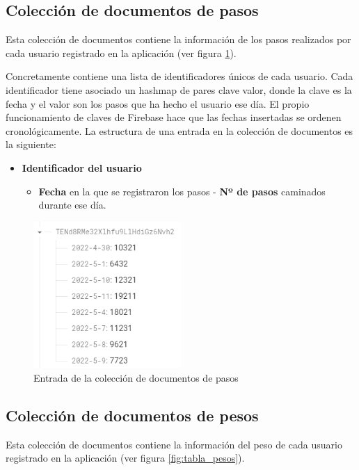 
\subsection{Colección de documentos de pasos}
Esta colección de documentos contiene la información de los pasos realizados por cada usuario registrado en la aplicación (ver figura \ref{fig:tabla_pasos}).

Concretamente contiene una lista de identificadores únicos de cada usuario. Cada identificador tiene asociado un hashmap  de pares clave valor, donde la clave es la fecha y el valor son los pasos que ha hecho el usuario ese día. El propio funcionamiento de claves de Firebase hace que las fechas insertadas se ordenen cronológicamente. La estructura de una entrada en la colección de documentos es la siguiente:

\begin{itemize}
    \item \textbf{Identificador del usuario}
    \begin{itemize}
        \item \textbf{Fecha} en la que se registraron los pasos - \textbf{Nº de pasos} caminados durante ese día.
    \end{itemize}
\end{itemize}

\begin{figure}[H]
    \centering
    \includegraphics[width=0.5\textwidth]{Images/Capitulo5/stepsTable.png}
    \caption{Entrada de la colección de documentos de pasos}
    \label{fig:tabla_pasos}
\end{figure}


\subsection{Colección de documentos de pesos}
Esta colección de documentos contiene la información del peso de cada usuario registrado en la aplicación (ver figura \ref{fig:tabla_pesos}).

